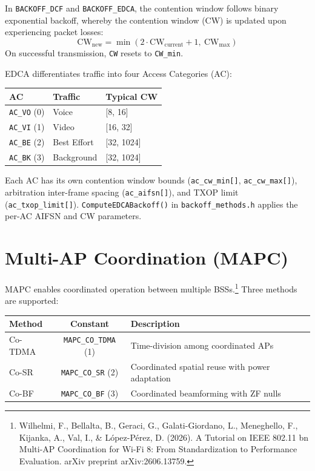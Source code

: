 \documentclass[11pt,a4paper]{article}
\begin{document}
In \texttt{BACKOFF\_DCF} and \texttt{BACKOFF\_EDCA}, the contention window follows binary exponential backoff, whereby the contention window (CW) is updated upon experiencing packet losses:
\[
  \text{CW}_{\text{new}} = \min(2 \cdot \text{CW}_{\text{current}} + 1, \ \text{CW}_{\text{max}})
\]
On successful transmission, \texttt{CW} resets to \texttt{CW\_min}.

EDCA differentiates traffic into four Access Categories (AC):

\begin{longtable}{l l l}
\toprule
\textbf{AC} & \textbf{Traffic} & \textbf{Typical CW} \\
\midrule
\texttt{AC\_VO} (0) & Voice      & [8, 16] \\
\texttt{AC\_VI} (1) & Video      & [16, 32] \\
\texttt{AC\_BE} (2) & Best Effort & [32, 1024] \\
\texttt{AC\_BK} (3) & Background & [32, 1024] \\
\bottomrule
\end{longtable}

Each AC has its own contention window bounds (\texttt{ac\_cw\_min[]}, \texttt{ac\_cw\_max[]}), arbitration inter-frame spacing (\texttt{ac\_aifsn[]}), and TXOP limit (\texttt{ac\_txop\_limit[]}).
\texttt{ComputeEDCABackoff()} in \texttt{backoff\_methods.h} applies the per-AC AIFSN and CW parameters.

\section{Multi-AP Coordination (MAPC)}
\label{sec:mapc}

MAPC enables coordinated operation between multiple BSSs.\footnote{Wilhelmi, F., Bellalta, B., Geraci, G., Galati-Giordano, L., Meneghello, F., Kijanka, A., Val, I., \& López-Pérez, D. (2026). A Tutorial on IEEE 802.11 bn Multi-AP Coordination for Wi-Fi 8: From Standardization to Performance Evaluation. arXiv preprint arXiv:2606.13759.}  Three methods are supported:

\begin{longtable}{l c p{7cm}}
\toprule
\textbf{Method} & \textbf{Constant} & \textbf{Description} \\
\midrule
Co-TDMA & \texttt{MAPC\_CO\_TDMA} (1) & Time-division among coordinated APs \\
Co-SR   & \texttt{MAPC\_CO\_SR} (2)   & Coordinated spatial reuse with power adaptation \\
Co-BF   & \texttt{MAPC\_CO\_BF} (3)   & Coordinated beamforming with ZF nulls \\
\bottomrule
\end{longtable}
\end{document}
